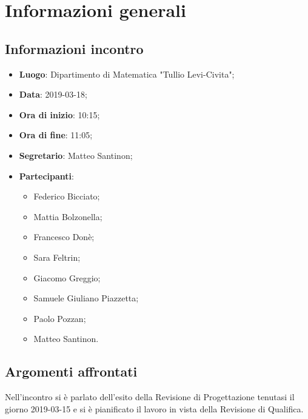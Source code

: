 \section{Informazioni generali}

\subsection{Informazioni incontro}
\begin{itemize}
\item \textbf{Luogo}: Dipartimento di Matematica "Tullio Levi-Civita";
\item \textbf{Data}: 2019-03-18;
\item \textbf{Ora di inizio}: 10:15;
\item \textbf{Ora di fine}: 11:05;
\item \textbf{Segretario}: Matteo Santinon;
\item \textbf{Partecipanti}: 
\begin{itemize}
	\item Federico Bicciato;
	\item Mattia Bolzonella;
	\item Francesco Donè;
	\item Sara Feltrin;
	\item Giacomo Greggio;
	\item Samuele Giuliano Piazzetta;
	\item Paolo Pozzan;
	\item Matteo Santinon.
\end{itemize}
\end{itemize}

\subsection{Argomenti affrontati}
Nell'incontro si è parlato dell'esito della Revisione di 
Progettazione tenutasi il giorno 2019-03-15 e si è pianificato il lavoro in vista della Revisione di Qualifica.
